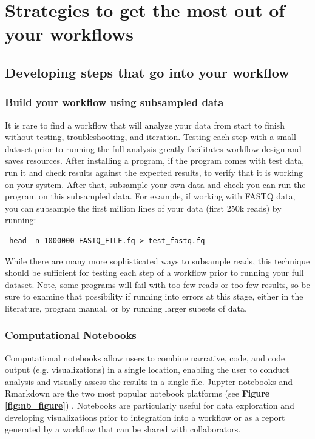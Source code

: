 \documentclass[10pt,letterpaper]{article}
\begin{document}
\section*{Strategies to get the most out of your workflows}

\subsection*{Developing steps that go into your workflow}

\subsubsection*{Build your workflow using subsampled data}

It is rare to find a workflow that will analyze your data from start to finish without testing, troubleshooting, and iteration.
Testing each step with a small dataset prior to running the full analysis greatly facilitates workflow design and saves resources.
After installing a program, if the program comes with test data, run it and check results against the expected results, to verify that it is working on your system. 
After that, subsample your own data and check you can run the program on this subsampled data. 
For example, if working with FASTQ data, you can subsample the first million lines of your data (first 250k reads) by running:

 \begin{lstlisting}
 head -n 1000000 FASTQ_FILE.fq > test_fastq.fq 
\end{lstlisting}

While there are many more sophisticated ways to subsample reads, this technique should be sufficient for testing each step of a workflow prior to running your full dataset. 
Note, some programs will fail with too few reads or too few results, so be sure to examine that possibility if running into errors at this stage, either in the literature, program manual, or by running larger subsets of data.

\subsubsection*{Computational Notebooks} 

Computational notebooks allow users to combine narrative, code, and code output (e.g. visualizations) in a single location, enabling the user to conduct analysis and visually assess the results in a single file.
Jupyter notebooks and Rmarkdown are the two most popular notebook platforms (see \textbf{Figure \ref{fig:nb_figure}}) \cite{kluyver2016jupyter, allaire2018rmarkdown}. 
Notebooks are particularly useful for data exploration and developing visualizations prior to integration into a workflow or as a report generated by a workflow that can be shared with collaborators. 
\end{document}
